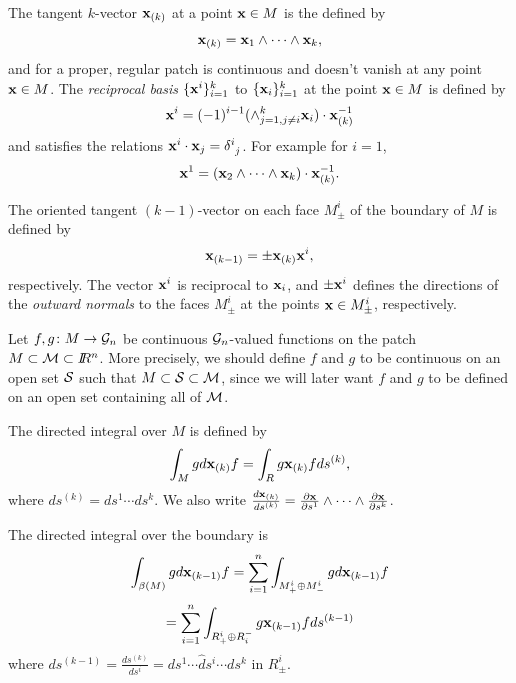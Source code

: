 \documentclass[12]{article}
\def\no{\noindent}
\def\bx{{\bf x}}
\def\R{I\!\!R}
\def\w{\wedge}
\def\no{\noindent}
\def\no{\noindent}
\def\no{\noindent}
\def\G{I\!\!\!G}
\def \xx {{\bf x}}
\def \G {{\cal G}}
\begin{document}
The tangent $k$-vector $\xx_{(k)}$ at a point $\bx\in M$ is the  defined by 
\begin{equation}
\xx_{(k)}=\xx_1\wedge \cdots \wedge \xx_k,
\end{equation}
and for a proper, regular patch is continuous and doesn't vanish at any point $\bx \in M$.
The {\it reciprocal basis} $\{\bx^i\}_{i=1}^k$ to $\{\xx_i\}_{i=1}^k$ at the point $\bx \in M$
is defined by
  \[ \bx^i =(-1)^{i-1}(\w_{j=1,j\ne i}^k \bx_i)\cdot \bx_{(k)}^{-1} \]
and satisfies the relations $\bx^i\cdot \bx_j = \delta^i_{\ j}$. For example for $i=1$,
  \[ \bx^1 = (\bx_2 \w \cdots \w \bx_k)\cdot  \bx_{(k)}^{-1} . \]  

The oriented tangent $(k-1)$-vector on each face $M^i_\pm$ of the boundary of $M$ is
defined by 
\begin{equation}
\xx_{(k-1)}=\pm \xx_{(k)}\xx^i,
\end{equation}
respectively.  The vector $\xx^i$ is reciprocal to $\xx_i$, and $\pm \xx^i$ defines
the directions of the {\it outward normals} to the faces $M^i_\pm$ at the points $\bx\in M^i_\pm$, respectively. 


Let $f,g\colon M\to \G_n$ be continuous $\G_n$-valued 
functions on the patch $M \subset {\cal M} \subset \R^n$. More precisely, we should define $f$ and $g$ to
be continuous on an open set ${\cal S}$ such that $M \subset {\cal S} \subset {\cal M}$, since we will
later want $f$ and $g$ to be defined on an open set containing all of $\cal M$.

\bigskip

\no {\bf Definition:} The directed integral over $M$ is defined by
\begin{equation}
\int_{M}gd\xx_{(k)}f=\int_{R}g\xx_{(k)}fds^{(k)} ,
\end{equation}
where $ds^{(k)}=ds^1\cdots ds^k$.
We also write $\frac{d \bx_{(k)}}{ds^{(k)}}=\frac{\partial \bx}{\partial s^1}\w \cdots 
\w \frac{\partial \bx}{\partial s^k}$.

\bigskip

\no {\bf Definition:} The directed integral over the boundary is
\begin{displaymath}
\int_{\beta(M)}gd\xx_{(k-1)}f=
\sum_{i=1}^n \int_{M^i_+ \oplus M^i_-}gd\xx_{(k-1)}f
\end{displaymath}
\begin{displaymath}
=\sum_{i=1}^n  \int_{R^i_+ \oplus R_i^-}g\xx_{(k-1)}f ds^{(k-1)}
\end{displaymath}
where $ds^{(k-1)}=\frac{ds^{(k)}}{ds^i}=ds^1\cdots\widehat ds^i \cdots ds^k$ in $R^i_\pm$.
\end{document}
